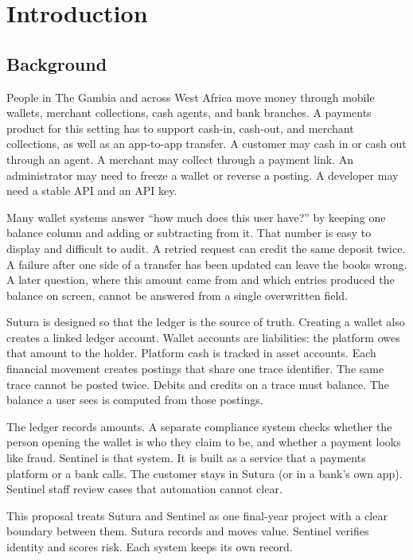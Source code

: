 \documentclass[12pt,a4paper]{article}
\begin{document}
\newpage
\tableofcontents
\newpage

\section{Introduction}

\subsection{Background}

People in The Gambia and across West Africa move money through mobile wallets, merchant collections, cash agents, and bank branches. A payments product for this setting has to support cash-in, cash-out, and merchant collections, as well as an app-to-app transfer. A customer may cash in or cash out through an agent. A merchant may collect through a payment link. An administrator may need to freeze a wallet or reverse a posting. A developer may need a stable API and an API key.

Many wallet systems answer ``how much does this user have?'' by keeping one balance column and adding or subtracting from it. That number is easy to display and difficult to audit. A retried request can credit the same deposit twice. A failure after one side of a transfer has been updated can leave the books wrong. A later question, where this amount came from and which entries produced the balance on screen, cannot be answered from a single overwritten field.

Sutura is designed so that the ledger is the source of truth. Creating a wallet also creates a linked ledger account. Wallet accounts are liabilities: the platform owes that amount to the holder. Platform cash is tracked in asset accounts. Each financial movement creates postings that share one trace identifier. The same trace cannot be posted twice. Debits and credits on a trace must balance. The balance a user sees is computed from those postings.

The ledger records amounts. A separate compliance system checks whether the person opening the wallet is who they claim to be, and whether a payment looks like fraud. Sentinel is that system. It is built as a service that a payments platform or a bank calls. The customer stays in Sutura (or in a bank's own app). Sentinel staff review cases that automation cannot clear.

This proposal treats Sutura and Sentinel as one final-year project with a clear boundary between them. Sutura records and moves value. Sentinel verifies identity and scores risk. Each system keeps its own record.
\end{document}
